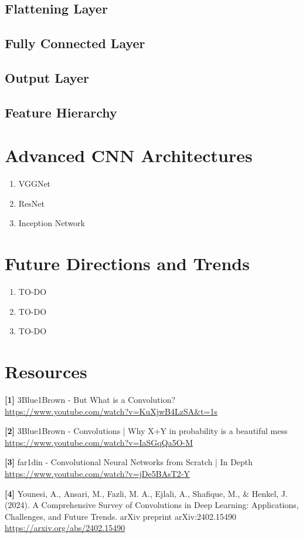 \documentclass{article}
\begin{document}
    \subsection{Flattening Layer}

    \subsection{Fully Connected Layer}

    \subsection{Output Layer}

    \subsection{Feature Hierarchy}
    
\section{Advanced CNN Architectures}
    \begin{enumerate}[label=(\alph*)]
        \item VGGNet
        \item ResNet
        \item Inception Network
    \end{enumerate}
    
\section{Future Directions and Trends}
    \begin{enumerate}[label=(\alph*)]
        \item TO-DO
        \item TO-DO
        \item TO-DO
    \end{enumerate}

\section{Resources}
    \textbf{[1]} 3Blue1Brown - But What is a Convolution? \\
    \url{https://www.youtube.com/watch?v=KuXjwB4LzSA&t=1s}
    
    \textbf{[2]} 3Blue1Brown - Convolutions | Why X+Y in probability is a beautiful mess \\
    \url{https://www.youtube.com/watch?v=IaSGqQa5O-M}
    
    \textbf{[3]} far1din - Convolutional Neural Networks from Scratch | In Depth \\
    \url{https://www.youtube.com/watch?v=jDe5BAsT2-Y}
    
    \textbf{[4]} Younesi, A., Ansari, M., Fazli, M. A., Ejlali, A., Shafique, M., \& Henkel, J. (2024). A Comprehensive Survey of Convolutions in Deep Learning: Applications, Challenges, and Future Trends. arXiv preprint arXiv:2402.15490 \\
    \url{https://arxiv.org/abs/2402.15490}
\end{document}
